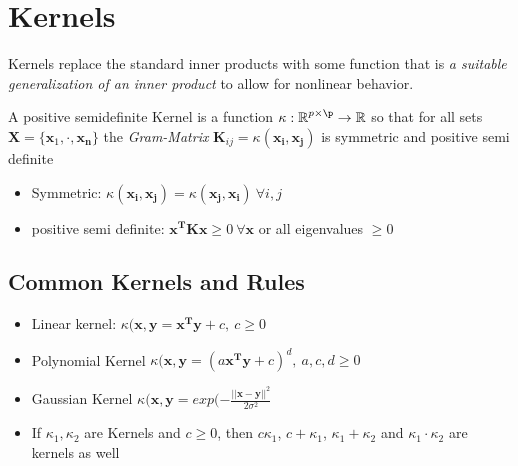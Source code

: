 \documentclass[english]{latex4ei/latex4ei_sheet}
\begin{document}
\section{Kernels}
\begin{sectionbox}
Kernels replace the standard inner products with some function that is \emph{a suitable generalization of an inner product} to allow for nonlinear behavior.
\begin{emphbox}
    A positive semidefinite Kernel is a function $\kappa: \R^{p\times\p}\rightarrow\R$ so that for all sets $\mathbf{X}=\{\mathbf{x}_1,\cdot,\mathbf{x_n}\}$ the \emph{Gram-Matrix} $\mathbf{K}_{ij} = \kappa(\mathbf{x_i,x_j})$ is symmetric and positive semi definite  
\end{emphbox}
\begin{itemize}
    \item Symmetric: $\kappa(\mathbf{x_i,x_j})=\kappa(\mathbf{x_j,x_i}) \ \forall i,j$
    \item positive semi definite: $\mathbf{x^TKx}\ge 0\ \forall \mathbf{x}$ or all eigenvalues $\ge 0$
\end{itemize}
\subsection{Common Kernels and Rules}
\begin{itemize}
    \item Linear kernel: $\kappa(\mathbf{x,y}=\mathbf{x^Ty}+c, \ c\ge0$
    \item Polynomial Kernel $\kappa(\mathbf{x,y}=(a\mathbf{x^Ty}+c)^d,\ a,c,d\ge0 $
    \item Gaussian Kernel $\kappa(\mathbf{x,y}=exp(-\frac{||\mathbf{x-y}||^2}{2\sigma^2}$
    \item If $\kappa_1, \kappa_2$ are Kernels and $c\ge0$, then $c\kappa_1$, $c+\kappa_1$, $\kappa_1+\kappa_2$ and $\kappa_1\cdot\kappa_2$ are kernels as well
\end{itemize}
\end{sectionbox}
\end{document}
